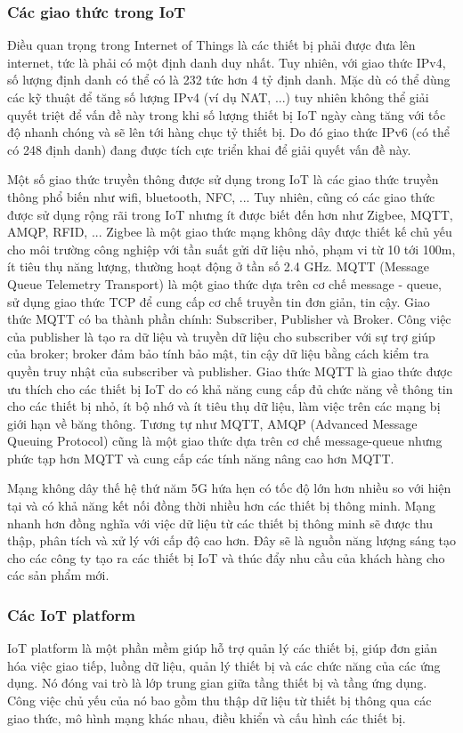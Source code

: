 \subsubsection{Các giao thức trong IoT}
Điều quan trọng trong Internet of Things là các thiết bị phải được đưa lên internet, tức là phải có một định danh duy nhất. Tuy nhiên, với giao thức IPv4, số lượng định danh có thể có là 232 tức hơn 4 tỷ định danh. Mặc dù có thể dùng các kỹ thuật để tăng số lượng IPv4 (ví dụ NAT, ...) tuy nhiên không thể giải quyết triệt để vấn đề này trong khi số lượng thiết bị IoT ngày càng tăng với tốc độ nhanh chóng và sẽ lên tới hàng chục tỷ thiết bị. Do đó giao thức IPv6 (có thể có 248 định danh) đang được tích cực triển khai để giải quyết vấn đề này. 

Một số giao thức truyền thông được sử dụng trong IoT là các giao thức truyền thông phổ biến như wifi, bluetooth, NFC, ... Tuy nhiên, cũng có các giao thức được sử dụng rộng rãi trong IoT nhưng ít được biết đến hơn như Zigbee, MQTT, AMQP, RFID, ... Zigbee là một giao thức mạng không dây được thiết kế chủ yếu cho môi trường công nghiệp với tần suất gửi dữ liệu nhỏ, phạm vi từ 10 tới 100m, ít tiêu thụ năng lượng, thường hoạt động ở tần số 2.4 GHz. MQTT (Message Queue Telemetry Transport) là một giao thức dựa trên cơ chế message - queue, sử dụng giao thức TCP để cung cấp cơ chế truyền tin đơn giản, tin cậy. Giao thức MQTT có ba thành phần chính: Subscriber, Publisher và Broker. Công việc của publisher là tạo ra dữ liệu và truyền dữ liệu cho subscriber với sự trợ giúp của broker; broker đảm bảo tính bảo mật, tin cậy dữ liệu bằng cách kiểm tra quyền truy nhật của subscriber và publisher. Giao thức MQTT là giao thức được ưu thích cho các thiết bị IoT do có khả năng cung cấp đủ chức năng về thông tin cho các thiết bị nhỏ, ít bộ nhớ và ít tiêu thụ dữ liệu, làm việc trên các mạng bị giới hạn về băng thông. Tương tự như MQTT, AMQP (Advanced Message Queuing Protocol) cũng là một giao thức dựa trên cơ chế message-queue nhưng phức tạp hơn MQTT và cung cấp các tính năng nâng cao hơn MQTT.

Mạng không dây thế hệ thứ năm 5G hứa hẹn có tốc độ lớn hơn nhiều so với hiện tại và có khả năng kết nối đồng thời nhiều hơn các thiết bị thông minh. Mạng nhanh hơn đồng nghĩa với việc dữ liệu từ các thiết bị thông minh sẽ được thu thập, phân tích và xử lý với cấp độ cao hơn. Đây sẽ là nguồn năng lượng sáng tạo cho các công ty tạo ra các thiết bị IoT và thúc đẩy nhu cầu của khách hàng cho các sản phẩm mới. 


\subsubsection{Các IoT platform}
IoT platform là một phần mềm giúp hỗ trợ quản lý các thiết bị, giúp đơn giản hóa việc giao tiếp, luồng dữ liệu, quản lý thiết bị và các chức năng của các ứng dụng. Nó đóng vai trò là lớp trung gian giữa tầng thiết bị và tầng ứng dụng. Công việc chủ yếu của nó bao gồm thu thập dữ liệu từ thiết bị thông qua các giao thức, mô hình mạng khác nhau, điều khiển và cấu hình các thiết bị. 

